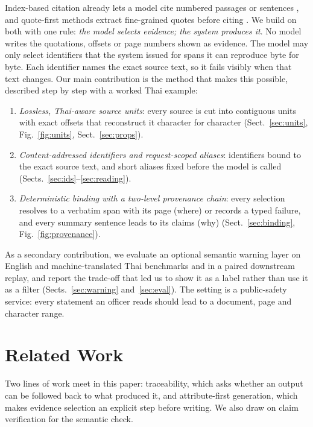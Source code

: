 \documentclass[runningheads]{llncs}
\begin{document}
Index-based citation already lets a model cite numbered passages or sentences
\cite{gao2023alce,zhang2025longcite}, and quote-first methods extract fine-grained quotes before citing
\cite{huang2024front}. We build on both with one rule: \emph{the model selects evidence; the system
produces it}. No model writes the quotations, offsets or page numbers shown as evidence. The model may only
select identifiers that the system issued for spans it can reproduce byte for byte. Each identifier
names the exact source text, so it fails visibly when that text changes. Our main contribution is the method that makes this
possible, described step by step with a worked Thai example:
\begin{enumerate}
\item \emph{Lossless, Thai-aware source units}: every source is cut into contiguous units with exact
offsets that reconstruct it character for character (Sect.~\ref{sec:units}, Fig.~\ref{fig:units},
Sect.~\ref{sec:props}).
\item \emph{Content-addressed identifiers and request-scoped aliases}: identifiers bound to the exact
source text, and short aliases fixed before the model is called (Sects.~\ref{sec:ids}--\ref{sec:reading}).
\item \emph{Deterministic binding with a two-level provenance chain}: every selection resolves to a
verbatim span with its page (where) or records a typed failure, and every summary sentence leads to its
claims (why) (Sect.~\ref{sec:binding}, Fig.~\ref{fig:provenance}).
\end{enumerate}
As a secondary contribution, we evaluate an optional semantic warning layer on English and
machine-translated Thai benchmarks and in a paired downstream replay, and report the trade-off that
led us to show it as a label rather than use it as a filter (Sects.~\ref{sec:warning} and~\ref{sec:eval}).
The setting is a public-safety service: every
statement an officer reads should lead to a document, page and character range.

\section{Related Work}

Two lines of work meet in this paper: traceability, which asks whether an output can be followed
back to what produced it, and attribute-first generation, which makes evidence selection an explicit
step before writing. We also draw on claim verification for the semantic check.
\end{document}
